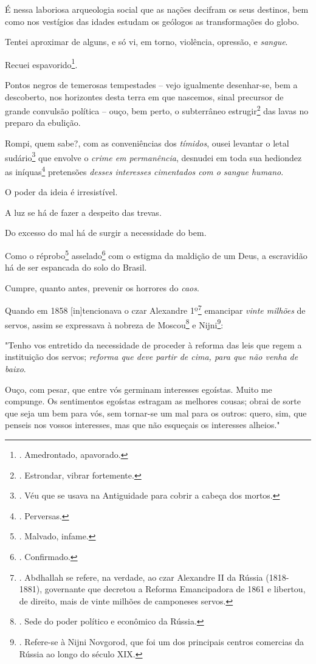 É nessa laboriosa arqueologia social que as nações decifram os seus
destinos, bem como nos vestígios das idades estudam os geólogos as
transformações do globo.

Tentei aproximar de alguns, e só vi, em torno, violência, opressão, e
\emph{sangue}.

Recuei espavorido\footnote{. Amedrontado, apavorado.}.

Pontos negros de temerosas tempestades -- vejo igualmente desenhar-se,
bem a descoberto, nos horizontes desta terra em que nascemos, sinal
precursor de grande convulsão política -- ouço, bem perto, o subterrâneo
estrugir\footnote{. Estrondar, vibrar fortemente.} das lavas no preparo
da ebulição.

Rompi, quem sabe?, com as conveniências dos \emph{tímidos}, ousei
levantar o letal sudário\footnote{. Véu que se usava na Antiguidade para
  cobrir a cabeça dos mortos.} que envolve o \emph{crime em
permanência}, desnudei em toda sua hediondez as iníquas\footnote{.
  Perversas.} pretensões \emph{desses interesses cimentados com o sangue
humano}.

O poder da ideia é irresistível.

A luz se há de fazer a despeito das trevas.

Do excesso do mal há de surgir a necessidade do bem.

Como o réprobo\footnote{. Malvado, infame.} asselado\footnote{.
  Confirmado.} com o estigma da maldição de um Deus, a escravidão há de
ser espancada do solo do Brasil.

Cumpre, quanto antes, prevenir os horrores do \emph{caos}.

Quando em 1858 {[}in{]}tencionava o czar Alexandre 1º\footnote{.
  Abdhallah se refere, na verdade, ao czar Alexandre II da Rússia
  (1818-1881), governante que decretou a Reforma Emancipadora de 1861 e
  libertou, de direito, mais de vinte milhões de camponeses servos.}
emancipar \emph{vinte milhões} de servos, assim se expressava à nobreza
de Moscou\footnote{. Sede do poder político e econômico da Rússia.} e
Nijni\footnote{. Refere-se à Nijni Novgorod, que foi um dos principais
  centros comercias da Rússia ao longo do século XIX.}:

"Tenho vos entretido da necessidade de proceder à reforma das leis que
regem a instituição dos servos; \emph{reforma que deve partir de cima,
para que não venha de baixo}.

Ouço, com pesar, que entre vós germinam interesses egoístas. Muito me
compunge. Os sentimentos egoístas estragam as melhores cousas; obrai de
sorte que seja um bem para vós, sem tornar-se um mal para os outros:
quero, sim, que penseis nos vossos interesses, mas que não esqueçais os
interesses alheios."

